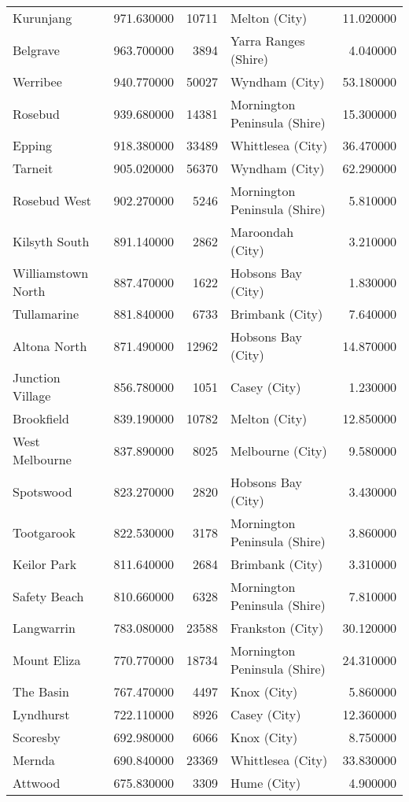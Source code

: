 \begin{table}
\begin{tabular}{lrrlr}
Kurunjang & 971.630000 & 10711 & Melton (City) & 11.020000 \\
Belgrave & 963.700000 & 3894 & Yarra Ranges (Shire) & 4.040000 \\
Werribee & 940.770000 & 50027 & Wyndham (City) & 53.180000 \\
Rosebud & 939.680000 & 14381 & Mornington Peninsula (Shire) & 15.300000 \\
Epping & 918.380000 & 33489 & Whittlesea (City) & 36.470000 \\
Tarneit & 905.020000 & 56370 & Wyndham (City) & 62.290000 \\
Rosebud West & 902.270000 & 5246 & Mornington Peninsula (Shire) & 5.810000 \\
Kilsyth South & 891.140000 & 2862 & Maroondah (City) & 3.210000 \\
Williamstown North & 887.470000 & 1622 & Hobsons Bay (City) & 1.830000 \\
Tullamarine & 881.840000 & 6733 & Brimbank (City) & 7.640000 \\
Altona North & 871.490000 & 12962 & Hobsons Bay (City) & 14.870000 \\
Junction Village & 856.780000 & 1051 & Casey (City) & 1.230000 \\
Brookfield & 839.190000 & 10782 & Melton (City) & 12.850000 \\
West Melbourne & 837.890000 & 8025 & Melbourne (City) & 9.580000 \\
Spotswood & 823.270000 & 2820 & Hobsons Bay (City) & 3.430000 \\
Tootgarook & 822.530000 & 3178 & Mornington Peninsula (Shire) & 3.860000 \\
Keilor Park & 811.640000 & 2684 & Brimbank (City) & 3.310000 \\
Safety Beach & 810.660000 & 6328 & Mornington Peninsula (Shire) & 7.810000 \\
Langwarrin & 783.080000 & 23588 & Frankston (City) & 30.120000 \\
Mount Eliza & 770.770000 & 18734 & Mornington Peninsula (Shire) & 24.310000 \\
The Basin & 767.470000 & 4497 & Knox (City) & 5.860000 \\
Lyndhurst & 722.110000 & 8926 & Casey (City) & 12.360000 \\
Scoresby & 692.980000 & 6066 & Knox (City) & 8.750000 \\
Mernda & 690.840000 & 23369 & Whittlesea (City) & 33.830000 \\
Attwood & 675.830000 & 3309 & Hume (City) & 4.900000 \\

\end{tabular}
\end{table}
